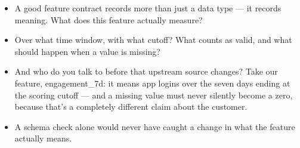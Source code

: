 \documentclass[11pt,a4paper]{article}
\begin{document}
\begin{examplebox}[title after break={SPOKEN SCRIPT --- slide 27 continued}]
\begin{itemize}
\item A good feature contract records more than just a data type — it records meaning. What does this feature actually measure?
\item Over what time window, with what cutoff? What counts as valid, and what should happen when a value is missing?
\item And who do you talk to before that upstream source changes? Take our feature, engagement\_7d: it means app logins over the seven days ending at the scoring cutoff — and a missing value must never silently become a zero, because that's a completely different claim about the customer.
\item A schema check alone would never have caught a change in what the feature actually means.
\end{itemize}
\end{examplebox}
\par\noindent{\scriptsize\textcolor{teal!60!black}{Reading anchor: Bass, Ch. 14 · Nazir et al. (2024) · Teaching contract}}
\clearpage
\end{document}
